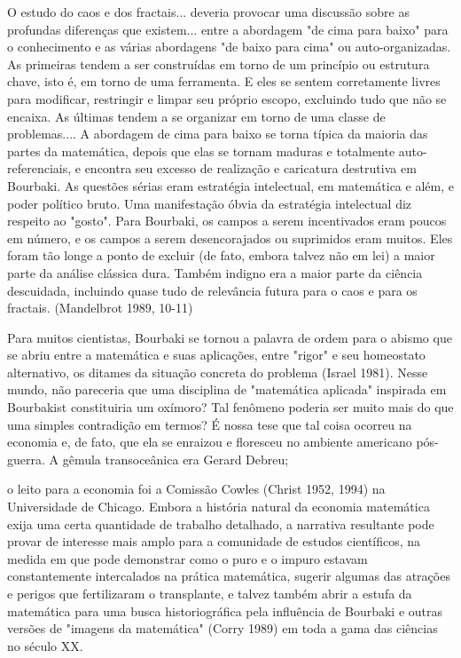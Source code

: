 \documentclass[a4paper,12pt]{article}[abntex2]
\begin{document}
O estudo do caos e dos fractais... deveria provocar uma discussão sobre as profundas diferenças que existem... entre a abordagem "de cima para baixo" para o conhecimento e as várias abordagens "de baixo para cima" ou auto-organizadas. As primeiras tendem a ser construídas em torno de um princípio ou estrutura chave, isto é, em torno de uma ferramenta. E eles se sentem corretamente livres para modificar, restringir e limpar seu próprio escopo, excluindo tudo que não se encaixa. As últimas tendem a se organizar em torno de uma classe de problemas.... A abordagem de cima para baixo se torna típica da maioria das partes da matemática, depois que elas se tornam maduras e totalmente auto-referenciais, e encontra seu excesso de realização e caricatura destrutiva em Bourbaki. As questões sérias eram estratégia intelectual, em matemática e além, e poder político bruto. Uma manifestação óbvia da estratégia intelectual diz respeito ao "gosto". Para Bourbaki, os campos a serem incentivados eram poucos em número, e os campos a serem desencorajados ou suprimidos eram muitos. Eles foram tão longe a ponto de excluir (de fato, embora talvez não em lei) a maior parte da análise clássica dura. Também indigno era a maior parte da ciência descuidada, incluindo quase tudo de relevância futura para o caos e para os fractais. (Mandelbrot 1989, 10-11)

Para muitos cientistas, Bourbaki se tornou a palavra de ordem para o abismo que se abriu entre a matemática e suas aplicações, entre "rigor" e seu homeostato alternativo, os ditames da situação concreta do problema (Israel 1981). Nesse mundo, não pareceria que uma disciplina de "matemática aplicada" inspirada em Bourbakist constituiria um oxímoro? Tal fenômeno poderia ser muito mais do que uma simples contradição em termos? É nossa tese que tal coisa ocorreu na economia e, de fato, que ela se enraizou e floresceu no ambiente americano pós-guerra. A gêmula transoceânica era Gerard Debreu;

o leito para a economia foi a Comissão Cowles (Christ 1952, 1994) na Universidade de Chicago. Embora a história natural da economia matemática exija uma certa quantidade de trabalho detalhado, a narrativa resultante pode provar de interesse mais amplo para a comunidade de estudos científicos, na medida em que pode demonstrar como o puro e o impuro estavam constantemente intercalados na prática matemática, sugerir algumas das atrações e perigos que fertilizaram o transplante, e talvez também abrir a estufa da matemática para uma busca historiográfica pela influência de Bourbaki e outras versões de "imagens da matemática" (Corry 1989) em toda a gama das ciências no século XX.
\end{document}
